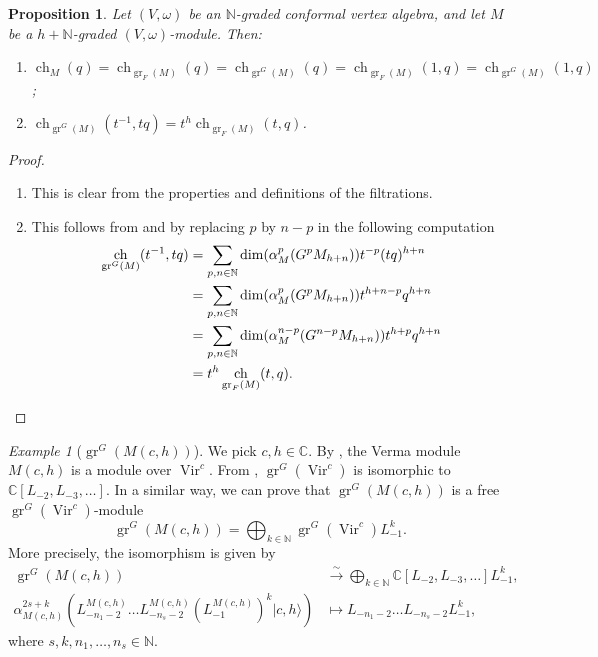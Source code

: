 \documentclass[a4paper, 12pt, reqno]{amsart}
\newtheorem{proposition}[theorem]{Proposition}
\theoremstyle{remark}
\newtheorem{example}[theorem]{Example}
\numberwithin{equation}{subsection}
\DeclareMathOperator{\Vir}{Vir}
\DeclareMathOperator{\gr}{gr}
\DeclareMathOperator{\ch}{ch}
\begin{document}
\begin{proposition}
  \label{prp:16}
  Let $(V, \omega)$ be an $\mathbb{N}$-graded conformal vertex algebra, and let $M$ be a $h + \mathbb{N}$-graded $(V, \omega)$-module.
  Then:
  \begin{enumerate}
  \item $\ch_M(q) = \ch_{\gr_F(M)}(q) = \ch_{\gr^G(M)}(q) = \ch_{\gr_F(M)}(1, q) = \ch_{\gr^G(M)}(1, q)$;
  \item $\ch_{\gr^G(M)}(t^{-1}, tq) = t^h\ch_{\gr_F(M)}(t, q)$.
  \end{enumerate}
\end{proposition}

\begin{proof}\leavevmode
  \begin{enumerate}
  \item This is clear from the properties and definitions of the filtrations.
  \item This follows from  and by replacing $p$ by $n - p$ in the following computation
    \begin{align*}
    \ch_{\gr^G(M)}(t^{-1}, tq) &= \sum_{p, n \in \mathbb{N}}\dim(\alpha^p_M(G^pM_{h + n}))t^{-p}(tq)^{h + n} \\
    &= \sum_{p, n \in \mathbb{N}}\dim(\alpha^p_M(G^pM_{h + n}))t^{h + n - p}q^{h + n} \\
    &= \sum_{p, n \in \mathbb{N}}\dim(\alpha^{n - p}_M(G^{n - p}M_{h + n}))t^{h + p}q^{h + n} \\
    &= t^h\ch_{\gr_F(M)}(t, q). \qedhere
    \end{align*}
  \end{enumerate}
\end{proof}

\begin{example}[$\gr^G(M(c, h))$]
  \label{exa:14}
  We pick $c, h \in \mathbb{C}$.
  By , the Verma module $M(c, h)$ is a module over $\Vir^c$.
  From , $\gr^G(\Vir^c)$ is isomorphic to $\mathbb{C}[L_{-2}, L_{-3}, \dots]$.
  In a similar way, we can prove that $\gr^G(M(c, h))$ is a free $\gr^G(\Vir^c)$-module
  \begin{equation*}
    \gr^G(M(c, h)) = \bigoplus_{k \in \mathbb{N}}\gr^G(\Vir^c)L_{-1}^k.
  \end{equation*}
  More precisely, the isomorphism is given by
  \begin{align*}
    \gr^G(M(c, h)) &\xrightarrow{\sim} \bigoplus_{k \in \mathbb{N}}\mathbb{C}[L_{-2}, L_{-3}, \dots]L_{-1}^k, \\
    \alpha_{M(c, h)}^{2s + k}(L_{-n_1 - 2}^{M(c, h)}\dots L_{-n_s - 2}^{M(c, h)}(L_{-1}^{M(c, h)})^k|c, h\rangle) &\mapsto L_{-n_1 - 2}\dots L_{-n_s - 2}L_{-1}^k,
  \end{align*}
  where $s, k, n_1, \dots, n_s \in \mathbb{N}$.
\end{example}
\end{document}
